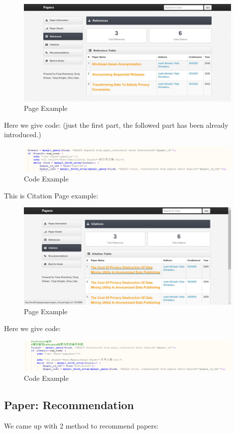 \documentclass{book}
\begin{document}
\begin{figure}[H]
\centering
\includegraphics[width=11.0cm]{img/yhb_paper_2.jpg}
\caption{Page Example}
\end{figure}
Here we give code: (just the first part, the followed part has been already introduced.)
\begin{figure}[H]
\centering
\includegraphics[width=11.0cm]{img/yhb_re_2.png}
\caption{Code Example}
\end{figure}

This is Citation Page example:
\begin{figure}[H]
\centering
\includegraphics[width=11.0cm]{img/yhb_paper_3.jpg}
\caption{Page Example}
\end{figure}
Here we give code:
\begin{figure}[htp]
\centering
\includegraphics[width=11.0cm]{img/yhb_re_1.png}
\caption{Code Example}
\end{figure}


\subsection{Paper: Recommendation}
We came up with 2 method to recommend papers: 
\end{document}
